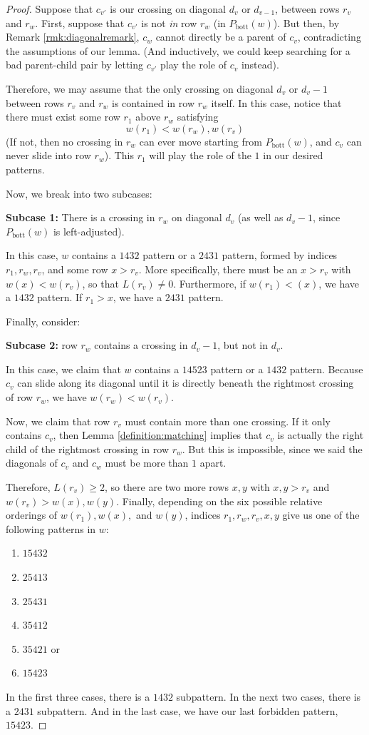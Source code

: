 \documentclass[10pt,a4paper]{amsart}
\begin{document}
\begin{proof}
    Suppose that $c_{v'}$ is our crossing on diagonal $d_v$ or $d_{v-1}$, between rows $r_v$ and $r_w$. First, suppose that $c_{v'}$ is not \textit{in} row $r_w$ (in $P_{\text{bott}}(w)$). But then, by Remark \ref{rmk:diagonalremark}, $c_w$ cannot directly be a parent of $c_v$, contradicting the assumptions of our lemma. (And inductively, we could keep searching for a bad parent-child pair by letting $c_{v'}$ play the role of $c_v$ instead).  
    

    Therefore, we may assume that the only crossing on diagonal $d_v$ or $d_{v}-1$ between rows $r_v$ and $r_w$ is contained in row $r_w$ itself. In this case, notice that there must exist some row $r_1$ above $r_w$ satisfying \[w(r_1)<w(r_w),w(r_v)\] 
    (If not, then no crossing in $r_w$ can ever move starting from $P_{\text{bott}}(w)$, and $c_v$ can never slide into row $r_w$). This $r_1$ will play the role of the $1$ in our desired patterns. 
    
    Now, we break into two subcases:

    \textbf{Subcase 1:} There is a crossing in $r_w$ on diagonal $d_v$ (as well as $d_{v}-1$, since $P_{\text{bott}}(w)$ is left-adjusted). 

    In this case, $w$ contains a $1432$ pattern or a $2431$ pattern, formed by indices $r_1, r_w, r_v$, and some row $x > r_v$. More specifically, there must be an $x > r_v$ with $w(x) < w(r_v)$, so that $L(r_v) \neq 0$. Furthermore, if $w(r_1) < (x)$, we have a $1432$ pattern. If $r_1 > x$, we have a $2431$ pattern. 
    
    Finally, consider:

    \textbf{Subcase 2:} row $r_w$ contains a crossing in $d_v-1$, but not in $d_v$. 

    In this case, we claim that $w$ contains a $14523$ pattern or a $1432$ pattern. Because $c_v$ can slide along its diagonal until it is directly beneath the rightmost crossing of row $r_w$, we have $w(r_w) < w(r_v)$.

    Now, we claim that row $r_v$ must contain more than one crossing. If it only contains $c_v$, then Lemma \ref{definition:matching} implies that $c_v$ is actually the right child of the rightmost crossing in row $r_w$. But this is impossible, since we said the diagonals of $c_v$ and $c_w$ must be more than $1$ apart. 

    Therefore, $L(r_v) \geq 2$, so there are two more rows $x, y$ with $x, y > r_v$ and $w(r_v) > w(x), w(y)$. Finally, depending on the six possible relative orderings of $w(r_1), w(x),$ and $w(y)$, indices $r_1, r_w, r_v, x, y$ give us one of the following patterns in $w$: 
    \begin{enumerate}
        \item $15432$
        \item $25413$
        \item $25431$
        \item $35412$
        \item $35421$ or 
        \item $15423$
    \end{enumerate}

    In the first three cases, there is a $1432$ subpattern. In the next two cases, there is a $2431$ subpattern. And in the last case, we have our last forbidden pattern, $15423$. 
\end{proof}
\end{document}
